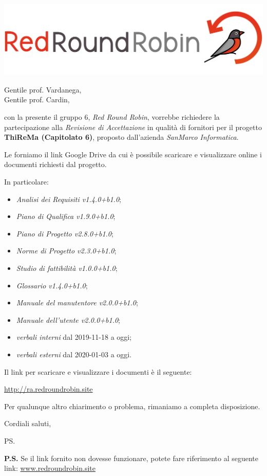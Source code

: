 \documentclass[12pt]{letter}
\date{15 maggio 2020}
\begin{document}
\begin{letter}{ }

\includegraphics[scale=0.17]{images/logo.png}

\opening{Gentile prof. Vardanega,\\ Gentile prof. Cardin, }

con la presente il gruppo 6, \textit{Red Round Robin}, vorrebbe richiedere la partecipazione alla \textit{Revisione di Accettazione} in qualità di fornitori per il progetto \textbf{ThiReMa (Capitolato 6)}, proposto dall'azienda \textit{SanMarco Informatica}.
\newline

Le forniamo il link Google Drive da cui è possibile scaricare e visualizzare online i documenti richiesti dal progetto.

In particolare:

\begin{itemize}
  	\item \textit{Analisi dei Requisiti v1.4.0+b1.0};
	\item \textit{Piano di Qualifica v1.9.0+b1.0};
	\item \textit{Piano di Progetto v2.8.0+b1.0};
	\item \textit{Norme di Progetto v2.3.0+b1.0};
	\item \textit{Studio di fattibilità v1.0.0+b1.0};
	\item \textit{Glossario v1.4.0+b1.0};
	\item \textit{Manuale del manutentore v2.0.0+b1.0};
	\item \textit{Manuale dell'utente v2.0.0+b1.0};
	\item \textit{verbali interni} dal 2019-11-18 a oggi;
	\item \textit{verbali esterni} dal 2020-01-03 a oggi.
\end{itemize}

Il link per scaricare e visualizzare i documenti è il seguente:

\begin{center}
\href{https://drive.google.com/drive/folders/1Bgp4GlxOqch6fmSjvgfuCC3z8yf3zROB?usp=sharing}{http://ra.redroundrobin.site}
\end{center}


Per qualunque altro chiarimento o problema, rimaniamo a completa disposizione.

\closing{Cordiali saluti,}


\vspace{3em}
\ps

\textbf{P.S.} Se il link fornito non dovesse funzionare, potete fare riferimento al seguente link:
\href{https://www.redroundrobin.site}{www.redroundrobin.site}

\end{letter}
\end{document}
